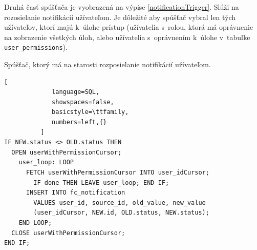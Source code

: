 \documentclass[slovak]{fitthesis}
\begin{document}
 Druhá časť spúšťača je vyobrazená na výpise \ref{notificationTrigger}. Slúži na rozosielanie notifikácií užívateľom. Je dôležité aby spúšťač vybral len tých užívateľov, ktorí majú k~úlohe prístup (užívatelia s~rolou, ktorá má oprávnenie na zobrazenie všetkých úloh, alebo užívatelia s~oprávnením k~úlohe v~tabuľke \texttt{user\_permissions}).
\begin{algorithm}[H]
  \caption{Spúšťač, ktorý má na starosti rozposielanie notifikácií užívateľom.}
  \label{notificationTrigger}
  \begin{lstlisting}[
             language=SQL,
             showspaces=false,
             basicstyle=\ttfamily,
             numbers=left,{}
          ]
IF NEW.status <> OLD.status THEN 
  OPEN userWithPermissionCursor; 
    user_loop: LOOP
      FETCH userWithPermissionCursor INTO user_idCursor;
        IF done THEN LEAVE user_loop; END IF;
      INSERT INTO fc_notification 
        VALUES user_id, source_id, old_value, new_value
        (user_idCursor, NEW.id, OLD.status, NEW.status);
    END LOOP;
  CLOSE userWithPermissionCursor;
END IF;
  \end{lstlisting}
\end{algorithm}
\end{document}
